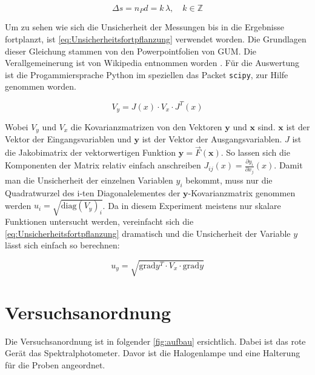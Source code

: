 \documentclass[11pt,ngerman]{scrartcl}
\begin{document}
\begin{equation}
	\Delta s  = n_P d = k \, \lambda, \quad k\in \mathbb{Z}
	\label{eq:opweg}
\end{equation}

\noindent Um zu sehen wie sich die Unsicherheit der Messungen bis in die Ergebnisse
fortplanzt, ist \autoref{eq:Unsicherheitsfortpflanzung} verwendet worden.
Die Grundlagen dieser Gleichung stammen von den Powerpointfolien von
GUM.\cite{WolfgangKessel2004} Die Verallgemeinerung ist von Wikipedia entnommen
worden \cite{2020Fehler}.
Für die Auswertung ist die Progammiersprache Python im speziellen das
Packet \verb#scipy#, zur Hilfe genommen worden.

\begin{equation}
	\label{eq:Unsicherheitsfortpflanzung}
	V_y = J(x) \cdot V_x \cdot J^{T}(x)
\end{equation}

\noindent Wobei $V_y$ und $V_x$ die Kovarianzmatrizen von den Vektoren $\bm{y}$ und $\bm{x}$ sind.
$\bm{x}$ ist der Vektor der Eingangsvariablen und $\bm{y}$ ist der Vektor der Ausgangsvariablen.
$J$ ist die Jakobimatrix der vektorwertigen Funktion $\bm{y} = \vec{F}(\bm{x})$.
So lassen sich die Komponenten der Matrix relativ einfach anschreiben $J_{ij}(x) = \frac{\partial{y_i}}{\partial{x_j}}(x)$.
Damit man die Unsicherheit der einzelnen Variablen $y_i$ bekommt, muss nur die Quadratwurzel des i-ten Diagonalelementes der
$\bm{y}$-Kovarianzmatrix genommen werden $u_i= \sqrt{\mathrm{diag}(V_y)_i}$.
Da in diesem Experiment meistens nur skalare Funktionen untersucht werden, vereinfacht
sich die \autoref{eq:Unsicherheitsfortpflanzung} dramatisch und die Unsicherheit
der Variable $y$ lässt sich einfach so berechnen:

\begin{equation}
	\label{eq:graduncentainty}
	u_y = \sqrt{\mathrm{grad} y^T \cdot V_x \cdot \mathrm{grad} y}
\end{equation}

\newpage

\section{Versuchsanordnung}\label{sec:Versuchsanordnung}

\noindent Die Versuchsanordnung ist in folgender \autoref{fig:aufbau}
ersichtlich. Dabei ist das rote Gerät das Spektralphotometer. Davor ist die
Halogenlampe und eine Halterung für die Proben angeordnet.
\end{document}
